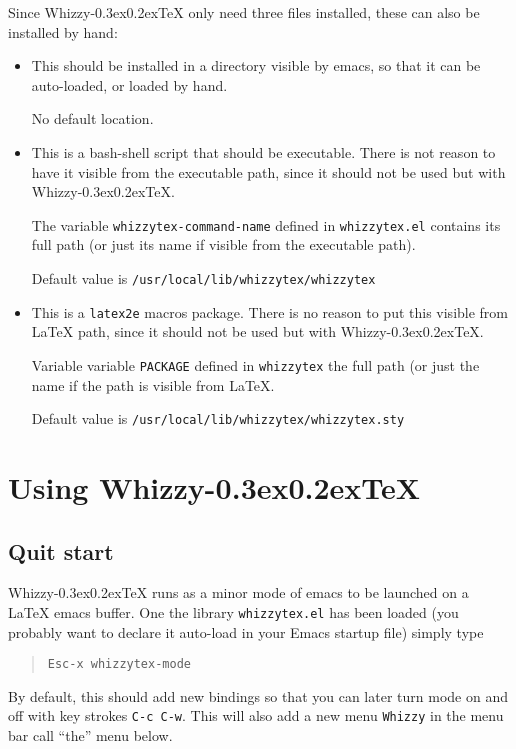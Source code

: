 \documentclass{article}
\makeatletter
\let \lst \verb
\def \whizzy {{Whizzy\kern -0.3ex\raise 0.2ex\hbox{\let \@\relax\TeX}}}
\makeatother
\begin{document}
Since {\whizzy} only need three files installed, these can also be installed
by hand:
\begin {itemize}

\item[]\hspace{-2em}{\tt whizzytex.el}

This should be installed in a directory visible by emacs, so that it can be
auto-loaded, or loaded by hand.

No default location.

\item[]\hspace {-2em}{\tt whizzytex}

This is a bash-shell script that should be executable.  There is not reason
to have it visible from the executable path, since it should not be used but
with {\whizzy}.

The variable {\tt whizzytex-command-name} defined in {\tt whizzytex.el} 
contains its full path (or just its name if visible from the executable
path). 

Default value is \lst"/usr/local/lib/whizzytex/whizzytex"

\item[]\hspace{-2em}{\tt whizzytex.sty}

This is a {\tt latex2e} macros package. 
There is no reason to put this visible from {\LaTeX} path, since it should
not be used but with {\whizzy}.

Variable variable {\tt PACKAGE} defined in {\tt whizzytex} 
the full path (or just the name if the path is visible from {\LaTeX}. 

Default value is \lst"/usr/local/lib/whizzytex/whizzytex.sty"

\end {itemize}

\section {Using {\whizzy}} 

\subsection {Quit start} 

{\whizzy} runs as a minor mode of emacs to be launched on a {\LaTeX}
emacs buffer. One the library \lst"whizzytex.el" has been loaded (you
probably want to declare it auto-load in your Emacs startup file)
simply type
\begin{quote}
\begin{verbatim}
Esc-x whizzytex-mode
\end{verbatim}
\end{quote}
By default, this should add new bindings so that you can later turn mode
on and off with key strokes {\tt C-c C-w}. This will also add a new menu
{\tt Whizzy} in the menu bar call ``the'' menu below.
\end{document}
